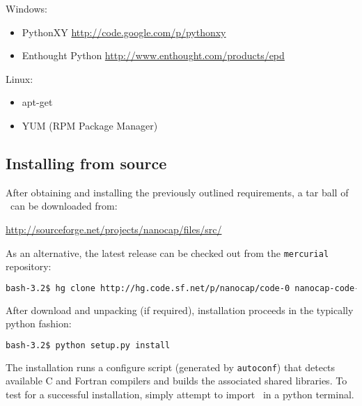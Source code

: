Windows:
\begin{itemize}
 \item PythonXY \url{http://code.google.com/p/pythonxy}
 \item Enthought Python \url{http://www.enthought.com/products/epd}
 \end{itemize}
 Linux:
 \begin{itemize}
\item apt-get 
\item YUM (RPM Package Manager)
 \end{itemize}
 
\subsection{Installing from source}

After obtaining and installing the previously outlined requirements, a tar ball of \nanocap~can be downloaded from:

\url{http://sourceforge.net/projects/nanocap/files/src/}

As an alternative, the latest release can be checked out from the \texttt{mercurial} repository:
\begin{lstlisting}[keywordstyle={\color{myterminalfont}},
			language={sh},
			commentstyle={\it\color{myterminalfont}},
			emphstyle={\ttb\color{myterminalfont}},
			stringstyle={\color{myterminalfont}},
			showstringspaces={false},
			otherkeywords={self},
			emph={MyClass,__init__},
			frame={},
			basicstyle={\ttm\color{myterminalfont}},
			morekeywords={True,False},
			captionpos={b},
			backgroundcolor={\color{myterminalbg}}]		
bash-3.2$ hg clone http://hg.code.sf.net/p/nanocap/code-0 nanocap-code-0
\end{lstlisting}
After download and unpacking (if required), installation proceeds in the typically python fashion:
\begin{lstlisting}[keywordstyle={\color{myterminalfont}},
			language={sh},
			commentstyle={\it\color{myterminalfont}},
			emphstyle={\ttb\color{myterminalfont}},
			stringstyle={\color{myterminalfont}},
			showstringspaces={false},
			otherkeywords={self},
			emph={MyClass,__init__},
			frame={},
			basicstyle={\ttm\color{myterminalfont}},
			morekeywords={True,False},
			captionpos={b},
			backgroundcolor={\color{myterminalbg}}]		
bash-3.2$ python setup.py install
\end{lstlisting}

The installation runs a configure script (generated by \texttt{autoconf}) that detects available C and Fortran compilers and builds the associated shared libraries. To test for a successful installation, simply attempt to import \nanocap~in a python terminal. 

